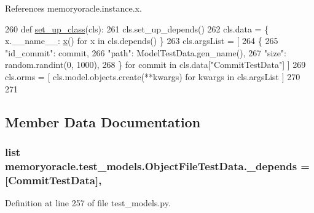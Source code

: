 References memoryoracle.\+instance.\+x.


\begin{DoxyCode}
260     \textcolor{keyword}{def }\hyperlink{classmemoryoracle_1_1test__models_1_1ObjectFileTestData_adf4fa9da652e3a9b4370825ca725231f}{set\_up\_class}(cls):
261         cls.set\_up\_depends()
262         cls.data = \{ x.\_\_name\_\_: \hyperlink{namespacememoryoracle_1_1instance_afe036cc8dc71469743d090c4c80d50c5}{x}() \textcolor{keywordflow}{for} x \textcolor{keywordflow}{in} cls.depends() \}
263         cls.argsList = [
264                 \{
265                     \textcolor{stringliteral}{"id\_commit"}: commit,
266                     \textcolor{stringliteral}{"path"}: ModelTestData.gen\_name(),
267                     \textcolor{stringliteral}{"size"}: random.randint(0, 1000),
268                 \} \textcolor{keywordflow}{for} commit \textcolor{keywordflow}{in} cls.data[\textcolor{stringliteral}{"CommitTestData"}] ]
269         cls.orms = [ cls.model.objects.create(**kwargs) \textcolor{keywordflow}{for} kwargs \textcolor{keywordflow}{in} cls.argsList ]
270 
271 
\end{DoxyCode}


\subsection{Member Data Documentation}
\hypertarget{classmemoryoracle_1_1test__models_1_1ObjectFileTestData_a58e83b2bf3943fecaeba312eb2219144}{}
\subsubsection[{\+\_\+depends}]{\setlength{\rightskip}{0pt plus 5cm}list memoryoracle.\+test\+\_\+models.\+Object\+File\+Test\+Data.\+\_\+depends = \mbox{[}{\bf Commit\+Test\+Data}\mbox{]}\hspace{0.3cm}{\ttfamily [static]}, {\ttfamily [private]}}\label{classmemoryoracle_1_1test__models_1_1ObjectFileTestData_a58e83b2bf3943fecaeba312eb2219144}


Definition at line 257 of file test\+\_\+models.\+py.

\hypertarget{classmemoryoracle_1_1test__models_1_1ObjectFileTestData_ab61a7fbd6465c4e2d803c81199ab677b}{}
